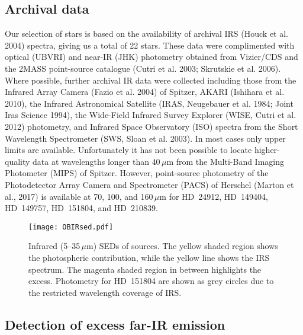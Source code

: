 \documentclass[tradiabstract]{aa} %
\begin{document}
\subsection{Archival data}

Our selection of stars is based on the availability of archival IRS
(Houck et al. 2004) spectra, giving us a total of 22 stars. These data
were complimented with optical (UBVRI) and near-IR (JHK) photometry
obtained from { Vizier/CDS} and the 2MASS point-source catalogue
(Cutri et al. 2003; Skrutskie et al. 2006). Where possible, further
archival IR data were collected including those from the Infrared
  Array Camera (Fazio et al. 2004) of Spitzer, AKARI (Ishihara et al.
  2010), the Infrared Astronomical Satellite (IRAS, Neugebauer et
  al. 1984; Joint Iras Science 1994), the Wide-Field Infrared Survey
  Explorer (WISE, Cutri et al. 2012) photometry, and Infrared Space
  Observatory (ISO) spectra from the Short Wavelength Spectrometer
  (SWS, Sloan et al. 2003). In most cases only upper limits are
available. Unfortunately it has not been possible to locate
higher-quality data at wavelengths longer than 40\,$\mu$m from the
Multi-Band Imaging Photometer (MIPS) of Spitzer. However, point-source
photometry of the Photodetector Array Camera and Spectrometer (PACS)
of Herschel (Marton et al., 2017) is available at 70, 100, and
160\,$\mu$m for { HD~24912, HD~149404, HD~149757, HD~151804, and
  HD~210839}.


\begin{figure*} [h!tb]
\texttt{[image: OBIRsed.pdf]}
\caption{Infrared (5--35\,$\mu$m) SEDs of sources. The yellow shaded
  region shows the photospheric contribution, while the yellow line
  shows the IRS spectrum. The magenta shaded region in between
  highlights the excess. Photometry for HD~151804 are shown as grey
  circles due to the restricted wavelength coverage of IRS. \label{OBIRsed.fig}}
\end{figure*}



\subsection{Detection of excess far-IR emission}
\end{document}
